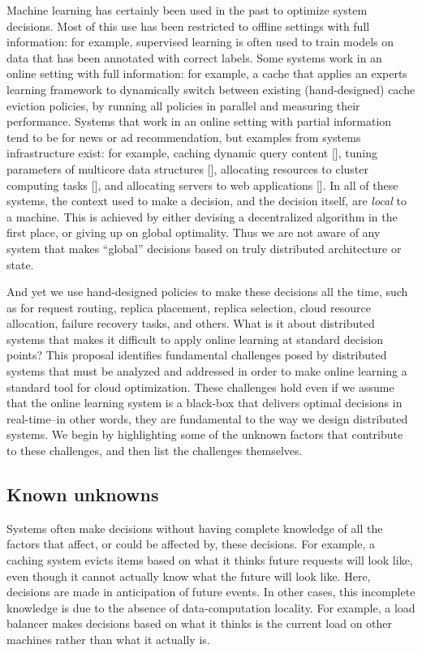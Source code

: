 \documentclass[a4paper,twocolumn]{article}
\begin{document}
Machine learning has certainly been used in the past to optimize system decisions. Most
of this use has been restricted to offline settings with full information: for example,
supervised learning is often used to train models on data that has been annotated with
correct labels. Some systems work in an online setting with full information: for example,
a cache that applies an experts learning framework to dynamically switch between existing
(hand-designed) cache eviction policies, by running all policies in parallel and measuring
their performance. Systems that work in an online setting with partial information tend to
be for news or ad recommendation, but examples from systems infrastructure exist: for example,
caching dynamic query content [], tuning parameters of multicore data structures [], allocating
resources to cluster computing tasks [], and allocating servers to web applications [].
In all of these systems, the context used to make a decision, and the
decision itself, are {\em local} to a machine. This is achieved by either devising a decentralized
algorithm in the first place, or giving up on global optimality. Thus we are not aware of any
system that makes ``global'' decisions based on truly distributed architecture or state.

And yet we use hand-designed policies to make these decisions all the time, such as for request
routing, replica placement, replica selection, cloud resource allocation, failure recovery tasks, 
and others. What is it about distributed systems that makes it difficult to apply online learning
at standard decision points? This proposal identifies fundamental challenges posed by distributed
systems that must be analyzed and addressed in order to make online learning a standard tool for
cloud optimization.  These challenges hold even if we assume that the online learning system is
a black-box that delivers optimal decisions in real-time--in other words, they are fundamental
to the way we design distributed systems.  We begin by highlighting some of the unknown factors
that contribute to these challenges, and then list the challenges themselves.

\subsection*{Known unknowns}
Systems often make decisions without having complete knowledge of all the
factors that affect, or could be affected by, these decisions.  For example, a
caching system evicts items based on what it thinks future requests will look
like, even though it cannot actually know what the future will look like. Here,
decisions are made in anticipation of future events.  In other cases, this
incomplete knowledge is due to the absence of data-computation locality. For
example, a load balancer makes decisions based on what it thinks is the current
load on other machines rather than what it actually is.
\end{document}
